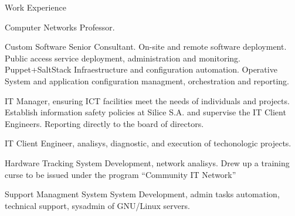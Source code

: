 \begin{rubric}{Work Experience}

 Computer Networks Professor. 

 Custom Software Senior Consultant. On-site
	and remote software deployment. Public access service deployment, administration and monitoring. 
	Puppet+SaltStack Infraestructure and configuration automation. Operative System and application 
	configuration managment, orchestration and reporting.

 IT Manager, ensuring ICT facilities meet the needs of 
	individuals and projects. Establish information safety policies at Silice S.A. and supervise 
	the IT Client Engineers. Reporting directly to the board of directors.

 IT Client Engineer, analisys, diagnostic, and execution of techonologic projects.

 Hardware Tracking System Development, network analisys. Drew up
	a training curse to be issued under the program ``Community IT Network''

 Support Managment System System Development,  
	admin tasks automation, technical support, sysadmin of GNU/Linux servers.
\end{rubric}
